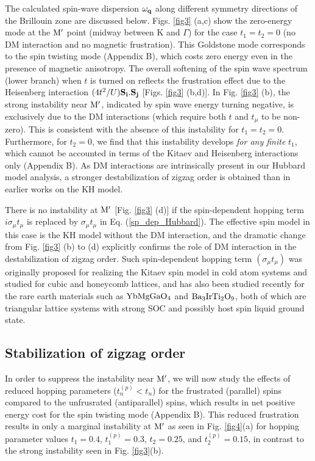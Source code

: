 \documentclass[aps,prb,fleqn,12pt,amsmath,amssymb]{revtex4}
\begin{document}
The calculated spin-wave dispersion $\omega_{\bf q}$ along different symmetry directions of the Brillouin zone are discussed below. Figs. \ref{fig3} (a,c) show the zero-energy mode at the ${\rm M'}$ point (midway between K and $\Gamma$) for the case $t_1=t_2=0$ (no DM interaction and no magnetic frustration). This Goldstone mode corresponds to the spin twisting mode (Appendix B), which costs zero energy even in the presence of magnetic anisotropy. The overall softening of the spin wave spectrum (lower branch) when $t$ is turned on reflects the frustration effect due to the Heisenberg interaction $(4t ^2/U){\bf S_i}.{\bf S_j}$ [Figs. \ref{fig3} (b,d)]. In Fig. \ref{fig3} (b), the strong instability near ${\rm M'}$, indicated by spin wave energy turning negative, is exclusively due to the DM interactions (which require both $t$ and $t_\mu$ to be non-zero). This is consistent with the absence of this instability for $t_1 = t_2 = 0$. Furthermore, for $t_2=0$, we find that this instability develops {\em for any finite} $t_1$, which cannot be accounted in terms of the Kitaev and Heisenberg interactions only (Appendix B). As DM interactions are intrinsically present in our Hubbard model analysis, a stronger destabilization of zigzag order is obtained than in earlier works on the KH model.

There is no instability at ${\rm M'}$ [Fig. \ref{fig3} (d)] if the spin-dependent hopping term $i\sigma_\mu t_\mu$ is replaced by $\sigma_\mu t_\mu$ in Eq. (\ref{sp_dep_Hubbard}). The effective spin model in this case is the KH model without the DM interaction, and the dramatic change from Fig. \ref{fig3} (b) to (d) explicitly confirms the role of DM interaction in the destabilization of zigzag order. Such spin-dependent hopping term $(\sigma_\mu t_\mu)$ was originally proposed for realizing the Kitaev spin model in cold atom systems and studied for cubic and honeycomb lattices,\cite{duan_PRL_2003,hassan_PRL_2013,rachel_PRL_2015} and has also been studied recently for the rare earth materials such as $\rm YbMgGaO_4$ and $\rm Ba_3IrTi_2O_9$, both of which are triangular lattice systems with strong SOC and possibly host spin liquid ground state.\cite{li_PRB_2016} 
 
\subsection{Stabilization of zigzag order}

In order to suppress the instability near ${\rm M'}$, we will now study the effects of reduced hopping parameters ($t_n ^{(p)} < t_n$) for the frustrated (parallel) spins compared to the unfrusrated (antiparallel) spins, which results in net positive energy cost for the spin twisting mode (Appendix B). This reduced frustration results in only a marginal instability at ${\rm M'}$ as seen in Fig. \ref{fig4}(a) for hopping parameter values $t_1=0.4$, $t_1 ^{(p)}=0.3$, $t_2=0.25$, and $t_2 ^{(p)}=0.15$, in contrast to the strong instability seen in Fig. \ref{fig3}(b). 
\end{document}
